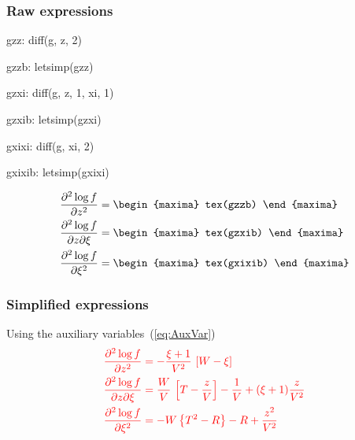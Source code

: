 \subsubsection*{Raw expressions}
\begin{maxima}
  gzz: diff(g, z, 2)
\end{maxima}%

\begin{maxima}
  gzzb: letsimp(gzz)
\end{maxima}%

\begin{maxima}
  gzxi: diff(g, z, 1, xi, 1)
\end{maxima}%

\begin{maxima}
  gzxib: letsimp(gzxi)
\end{maxima}%

\begin{maxima}
  gxixi: diff(g, xi, 2)
\end{maxima}%

\begin{maxima}
  gxixib: letsimp(gxixi)
\end{maxima}%

{\color{MonVertF} \small
\begin{align*}
  \frac{\partial^2 \log f}{\partial z^2}
  &=
  \begin{maxima}
    tex(gzzb)
  \end{maxima}\\
  \frac{\partial^2 \log f}{\partial z \partial \xi}
  &=
  \begin{maxima}
    tex(gzxib)
  \end{maxima}\\
  \frac{\partial^2 \log f}{\partial \xi^2}
  &=
  \begin{maxima}
    tex(gxixib)
  \end{maxima}
\end{align*}
}

\subsubsection*{Simplified expressions}
Using the auxiliary variables~(\ref{eq:AuxVar})
\begin{equation}
  \color{red}
  \label{eq:SimDer2Logf}
  \begin{aligned}
    \frac{\partial^2 \log f}{\partial z^2}
    &= - \frac{\xi + 1}{V^2}\, \left[W - \xi\right] \\
    \frac{\partial^2 \log f}{\partial z \partial \xi}
    &=  \frac{W}{V}\, \left[T - \frac{z}{V} \right] - \frac{1}{V}
      + (\xi + 1) \frac{z}{V^2}\\
    \frac{\partial^2 \log f}{\partial \xi^2} 
    &= - W\left\{T^2 - R  \right\} - R +  \frac{z^2}{V^2}
  \end{aligned}
\end{equation}




